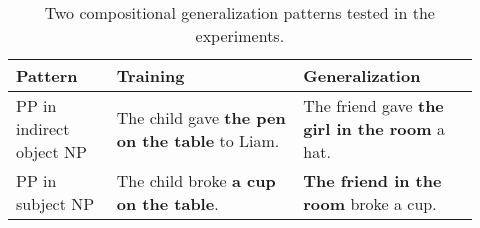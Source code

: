 \begin{table*}[t]
    \centering
    \begin{tabular}{p{0.20\linewidth}p{0.37\linewidth}p{0.35\linewidth}}
    \toprule
    Pattern & Training & Generalization \\
    \midrule
    PP in indirect object NP&
     The child gave \textbf{the pen on the table} to Liam.&
     The friend gave \textbf{the girl in the room} a hat.\\
    PP in subject NP &
     The child broke \textbf{a cup on the table}. &
    \textbf{The friend in the room} broke a cup.\\
     \bottomrule
    \end{tabular}
    \caption{Two compositional generalization patterns tested in the experiments.}
    \label{tab:generalization_pattern}
\end{table*}